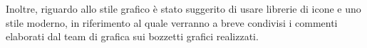 \documentclass[10pt, letterpaper]{article}
\begin{document}
Inoltre, riguardo allo stile grafico è stato suggerito di usare librerie di icone e uno stile moderno, in riferimento al quale verranno a breve 
condivisi i commenti elaborati dal team di grafica sui bozzetti grafici realizzati.




\makeDecisionTable


\makeTodoTable
\end{document}
